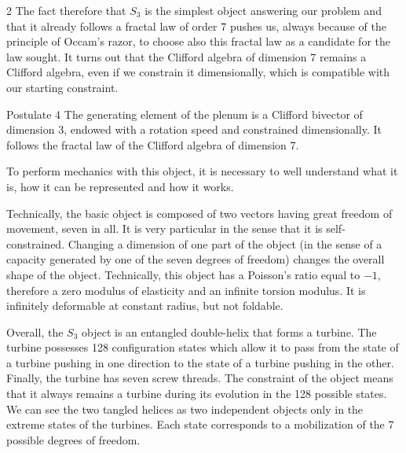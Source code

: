 \begin{multicols}{2}
	The fact therefore that $S_3$ is the simplest object answering 
	our problem and that it already follows a fractal law of order 7 
	pushes us, always because of the principle of Occam's razor, to choose also this 
	fractal law as a candidate for the law sought. It turns out that 
	the Clifford algebra of dimension 7 remains a Clifford algebra, 
	even if we constrain it dimensionally, which is compatible with 
	our starting constraint.
	
	\begin{mybox}[breakable,colback=blue!10, colbacktitle=pkcolor]{Postulate 4}
		The generating element of the plenum is a Clifford bivector of 
		dimension 3, endowed with a rotation speed and constrained 
		dimensionally. It follows the fractal law of the Clifford 
		algebra of dimension 7.
	\end{mybox}
	\medskip
	
	To perform mechanics with this object, it is necessary to well 
	understand what it is, how it can be represented and how it 
	works.
	
	Technically, the basic object is composed of two vectors having 
	great freedom of movement, seven in all. It is very particular 
	in the sense that it is self-constrained. Changing a dimension of one part 
	of the object (in the sense of a capacity generated by one of the seven degrees of freedom) 
	changes the overall shape of the object. Technically, this object has a Poisson's ratio equal to $-1$, therefore a zero modulus of elasticity and an infinite torsion modulus. It is infinitely deformable at constant radius, but not foldable.
	
	Overall, the $S_3$ object is an entangled double-helix that forms a 
	turbine. The turbine possesses 128 configuration states which 
	allow it to pass from the state of a turbine pushing in one direction to 
	the state of a turbine pushing in the other. Finally, the turbine has seven 
	screw threads. The constraint of the object means that it always remains a 
	turbine during its evolution in the 128 possible states. We 
	can see the two tangled helices as two independent objects 
	only in the extreme states of the turbines. Each state 
	corresponds to a mobilization of the 7 possible degrees of freedom.
\end{multicols}

